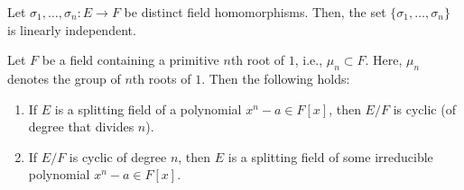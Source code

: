 \documentclass[twoside]{article}
\theoremstyle{remark}
\begin{document}
\begin{corollary}
  Let \(\sigma_1, \dots, \sigma_n\colon E \to F\) be distinct field homomorphisms. Then, the set \(\{\sigma_1, \dots, \sigma_n\}\) is linearly independent.
\end{corollary}

\begin{proposition}
  Let \(F\) be a field containing a primitive \(n\)th root of \(1\), i.e., \(\mu_n \subset F\). Here, \(\mu_n\) denotes the group of \(n\)th roots of \(1\). Then the following holds:
  \begin{enumerate}[label=\textup{(\arabic*)}, nosep]
    \item If \(E\) is a splitting field of a polynomial \(x^n - a \in F[x]\), then \(E/F\) is cyclic (of degree that divides \(n\)).
    \item If \(E/F\) is cyclic of degree \(n\), then \(E\) is a splitting field of some irreducible polynomial \(x^n - a \in F[x]\).
  \end{enumerate}
\end{proposition}
\end{document}
